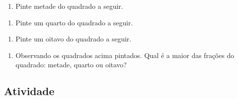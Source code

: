 \documentclass[a4,12pt]{book}
\begin{document}
\begin{enumerate} [\quad a)] %
  \item     Pinte metade do quadrado a seguir.
\end{enumerate} %
\mbox{} \newline  %
\begin{enumerate} [\quad a)] %
  \item     Pinte um quarto do quadrado a seguir.
\end{enumerate} %
\mbox{} \newline  %
\begin{enumerate} [\quad a)] %
  \item     Pinte um oitavo do quadrado a seguir.
\end{enumerate} %
\mbox{} \newline  %
\begin{enumerate} [\quad a)] %
  \item     Observando os quadrados acima pintados. Qual é a maior das frações do quadrado: metade, quarto ou oitavo?
\end{enumerate} %






\subsection{Atividade}
\end{document}
